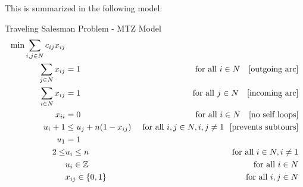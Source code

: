 This is summarized in the following model:
\begin{general}{Traveling Salesman Problem - MTZ Model}{}
\begin{align}
\min \sum_{i,j \in N} c_{ij} x_{ij}\\
\sum_{j\in N} x_{ij} &= 1 & \mbox{ for all } i \in N \ \ \mbox{ [outgoing arc]}\\
\sum_{i \in N} x_{ij} &= 1 & \mbox{ for all } j \in N \ \ \mbox{ [incoming arc]}\\
x_{ii} &= 0 & \mbox{ for all } i \in N \ \ \mbox{ [no self loops]} \\
u_i + 1 & \leq u_j + n(1-x_{ij})  & \mbox{ for all } i,j \in N, i,j \neq 1 \ \ \mbox{[prevents subtours]}\\
u_1 &= 1\\
2 \leq & u_i \leq n & \mbox{ for all } i \in N, i \neq 1\\
& u_i \in {\mathbb{Z}} & \mbox{ for all } i \in N\\
& x_{ij} \in \{0,1\} & \mbox{ for all } i,j \in N
\end{align}
\end{general}



